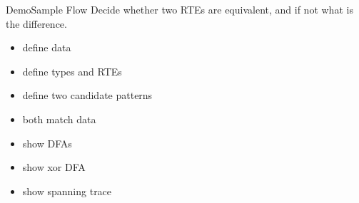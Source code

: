 \begin{frame}{Demo}{Sample Flow}
  Decide whether two RTEs are equivalent, and if not what is the difference.


  \begin{itemize}
  \item define data
  \item define types and RTEs
  \item define two candidate patterns
  \item both match data
  \item show DFAs
  \item show xor DFA
  \item show spanning trace
  \end{itemize}

\end{frame}
